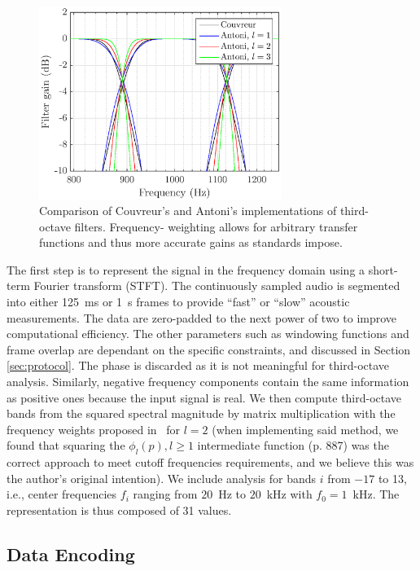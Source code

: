 \documentclass[sensors,article,accept,moreauthors,pdftex,10pt,a4paper]{mdpi}
\begin{document}
\begin{figure}[H]
	\centering
		\includegraphics[width=0.7\textwidth]{figures/tob_imp.eps}
	\caption{Comparison of Couvreur's and Antoni's implementations of third-octave filters. Frequency- weighting allows for arbitrary transfer functions and thus more accurate gains {as standards impose.}}
	\label{fig:freq_filt}
\end{figure}

The first step is to represent the signal in the frequency domain using a short-term Fourier transform (STFT). The continuously sampled audio is segmented into either 125~ms or 1~s frames to provide ``fast'' or ``slow'' acoustic measurements. The data {are} zero-padded to the next power of two to improve computational efficiency. The other parameters such as windowing functions and frame overlap are dependant on the specific constraints, and discussed in Section \ref{sec:protocol}. The phase is discarded as it is not meaningful for third-octave analysis. Similarly, negative frequency components contain the same information as positive ones because the input signal is real. We then compute third-octave bands from the squared spectral magnitude by matrix multiplication with the frequency weights proposed in~\cite{antoni2010} for $l = 2$ ({{when} implementing said method, we found that squaring the $\phi_l(p), l \geq 1$ intermediate function (p. 887) was the correct approach to meet cutoff frequencies requirements, and we believe this was the author's original {intention).}} We include analysis for bands $i$ from $-17$ to 13, i.e., center frequencies $f_i$ ranging from $20$~Hz to $20$~kHz with $f_0 = 1$~kHz. The representation is thus composed of 31 values.


\subsection{Data Encoding} \label{sec:dataenc}
\end{document}
